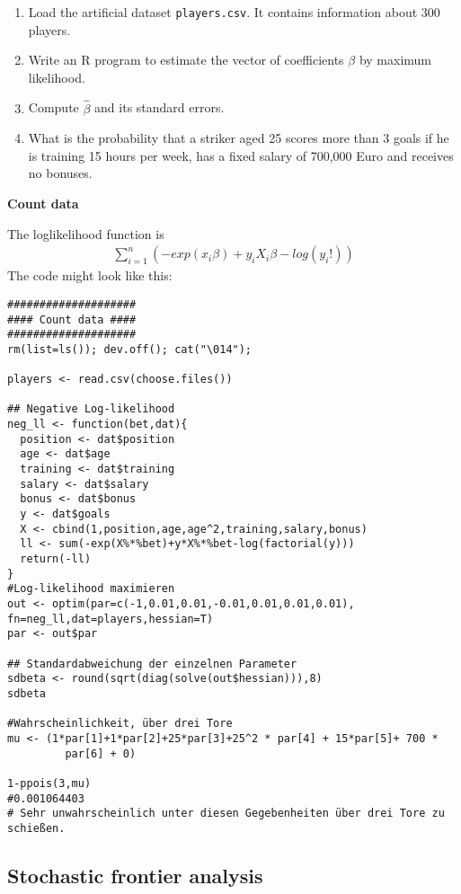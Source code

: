 \documentclass{article}
\begin{document}
\begin{enumerate}
\item Load the artificial dataset \texttt{players.csv}. It contains
information about 300 players.

\item Write an R program to estimate the vector of coefficients $\beta $ by
maximum likelihood.

\item Compute $\hat{\beta}$ and its standard errors.

\item What is the probability that a striker aged 25 scores more than 3
goals if he is training 15 hours per week, has a fixed salary of 700,000
Euro and receives no bonuses.
\end{enumerate}

\begin{solution}
\textbf{Count data}

The loglikelihood function is
\begin{align*}
\sum_{i=1}^{n}\left(-exp(x_i\beta) + y_i X_i\beta - log(y_i!)\right)
\end{align*}
The code might look like this:
\begin{verbatim}
####################
#### Count data ####
####################
rm(list=ls()); dev.off(); cat("\014");

players <- read.csv(choose.files())

## Negative Log-likelihood
neg_ll <- function(bet,dat){
  position <- dat$position
  age <- dat$age
  training <- dat$training
  salary <- dat$salary
  bonus <- dat$bonus
  y <- dat$goals
  X <- cbind(1,position,age,age^2,training,salary,bonus)
  ll <- sum(-exp(X%*%bet)+y*X%*%bet-log(factorial(y)))
  return(-ll)
}
#Log-likelihood maximieren
out <- optim(par=c(-1,0.01,0.01,-0.01,0.01,0.01,0.01), fn=neg_ll,dat=players,hessian=T)
par <- out$par

## Standardabweichung der einzelnen Parameter
sdbeta <- round(sqrt(diag(solve(out$hessian))),8)
sdbeta

#Wahrscheinlichkeit, über drei Tore
mu <- (1*par[1]+1*par[2]+25*par[3]+25^2 * par[4] + 15*par[5]+ 700 *
         par[6] + 0)

1-ppois(3,mu)
#0.001064403
# Sehr unwahrscheinlich unter diesen Gegebenheiten über drei Tore zu schießen.
\end{verbatim}
\end{solution}

\subsection{Stochastic frontier analysis\label{mlsfa}}
\end{document}
